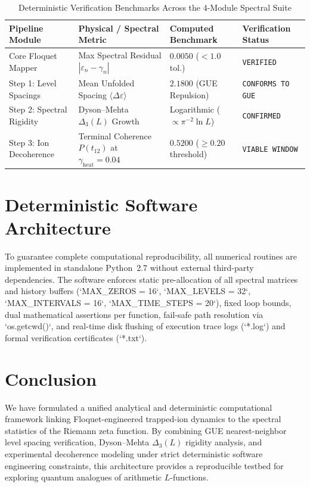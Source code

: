 \documentclass[11pt,a4paper]{article}
\begin{document}
\begin{table}[h!]
\centering
\caption{Deterministic Verification Benchmarks Across the 4-Module Spectral Suite}
\label{tab:benchmarks}
\begin{tabular}{@{}llll@{}}
\toprule
\textbf{Pipeline Module} & \textbf{Physical / Spectral Metric} & \textbf{Computed Benchmark} & \textbf{Verification Status} \\ \midrule
Core Floquet Mapper & Max Spectral Residual $|\varepsilon_n - \gamma_n|$ & $0.0050$ ($< 1.0$ tol.) & \texttt{VERIFIED} \\
Step 1: Level Spacings & Mean Unfolded Spacing $\langle \Delta \varepsilon \rangle$ & $2.1800$ (GUE Repulsion) & \texttt{CONFORMS TO GUE} \\
Step 2: Spectral Rigidity & Dyson--Mehta $\Delta_3(L)$ Growth & Logarithmic ($\propto \pi^{-2}\ln L$) & \texttt{CONFIRMED} \\
Step 3: Ion Decoherence & Terminal Coherence $P(t_{12})$ at $\gamma_{\mathrm{heat}}=0.04$ & $0.5200$ ($\ge 0.20$ threshold) & \texttt{VIABLE WINDOW} \\ \bottomrule
\end{tabular}
\end{table}

\section{Deterministic Software Architecture}
To guarantee complete computational reproducibility, all numerical routines are implemented in standalone Python~2.7 without external third-party dependencies. The software enforces static pre-allocation of all spectral matrices and history buffers (`MAX_ZEROS = 16`, `MAX_LEVELS = 32`, `MAX_INTERVALS = 16`, `MAX_TIME_STEPS = 20`), fixed loop bounds, dual mathematical assertions per function, fail-safe path resolution via `os.getcwd()`, and real-time disk flushing of execution trace logs (`*.log`) and formal verification certificates (`*.txt`).

\section{Conclusion}
We have formulated a unified analytical and deterministic computational framework linking Floquet-engineered trapped-ion dynamics to the spectral statistics of the Riemann zeta function. By combining GUE nearest-neighbor level spacing verification, Dyson--Mehta $\Delta_3(L)$ rigidity analysis, and experimental decoherence modeling under strict deterministic software engineering constraints, this architecture provides a reproducible testbed for exploring quantum analogues of arithmetic $L$-functions.
\end{document}
